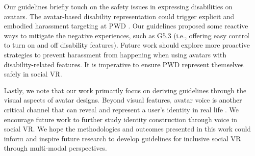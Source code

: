  Our guidelines briefly touch on the safety issues in expressing disabilities on avatars. The avatar-based disability representation could trigger explicit and embodied harassment targeting at PWD \cite{zhang2023}. Our guidelines proposed some reactive ways to mitigate the negative experiences, such as G5.3 (i.e., offering easy control to turn on and off disability features). %
Future work should explore more proactive strategies to prevent harassment from happening when using avatars with disability-related features. It is imperative to ensure PWD represent themselves safely in social VR.

 Lastly, we note that our work primarily focus on deriving guidelines through the visual aspects of avatar designs. Beyond visual features, avatar voice is another critical channel that can reveal and represent a user's identity in real life \cite{Povinelli_voice_2024}.  
We encourage future work to further study identity construction through voice in social VR. We hope the methodologies and outcomes presented in this work could inform and inspire future research to develop guidelines for inclusive social VR through multi-modal perspectives.  








